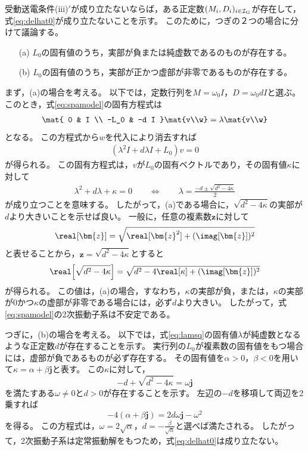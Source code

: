 \documentclass[tombow,dvipdfmx]{corona-a5-1.1}
\begin{document}
\begin{証明}
受動送電条件(iii)$'$が成り立たないならば，ある正定数$(M_i,D_i)_{i \in \mathcal{I}_{\rm G}}$が存在して，式\ref{eq:delhat0}が成り立たないことを示す。
このために，つぎの２つの場合に分けて議論する。
\begin{itemize}
\item[(a)] $L_0$の固有値のうち，実部が負または純虚数であるのものが存在する。
\item[(b)] $L_0$の固有値のうち，実部が正かつ虚部が非零であるものが存在する。
\end{itemize}
まず，(a)の場合を考える。
以下では，定数行列を$M=\omega_0 I$，$D=\omega_0 d I$と選ぶ。
このとき，式\ref{eq:spamodel}の固有方程式は
\begin{align*}
\mat{
0 & I \\
-L_0 & -d I
}
\mat{v\\w}
=
\lambda \mat{v\\w}
\end{align*}
となる。
この方程式から$w$を代入により消去すれば
\begin{align*}
\left(\lambda^2 I +d \lambda I + L_0
\right) v =0
\end{align*}
が得られる。
この固有方程式は，$v$が$L_0$の固有ベクトルであり，その固有値$\kappa$に対して
\begin{align}\label{eq:lamsq}
\lambda^2 + d\lambda +\kappa =0
\qquad
\Longleftrightarrow
\qquad
\lambda = \frac{-d \pm \sqrt{d^2-4\kappa} }{2}
\end{align}
が成り立つことを意味する。
したがって，(a)である場合に，$\sqrt{d^2 - 4\kappa }$の実部が$d$より大きいことを示せば良い。
一般に，任意の複素数$\bm{z}$に対して
\begin{align*}
\real[\bm{z}] = \sqrt{ \real[\bm{z}^2 ] + (\imag[\bm{z}])^2 }
\end{align*}
と表せることから，$\bm{z} = \sqrt{d^2 - 4\kappa }$とすると
\begin{align*}
\real \Bigl[
\sqrt{d^2 - 4\kappa }
\Bigr]
=\sqrt{
d^2 - 4 \real[\kappa]
+
(\imag[ \bm{z} ])^2
}
\end{align*}
が得られる。
この値は，(a)の場合，すなわち，$\kappa$の実部が負，または，$\kappa$の実部が0かつ$\kappa$の虚部が非零である場合には，必ず$d$より大きい。
したがって，式\ref{eq:spamodel}の2次振動子系は不安定である。

つぎに，(b)の場合を考える。
以下では，式\ref{eq:lamsq}の固有値$\lambda$が純虚数となるような正定数$d$が存在することを示す。
実行列の$L_0$が複素数の固有値をもつ場合には，虚部が負であるものが必ず存在する。
その固有値を$\alpha>0$，$\beta < 0$を用いて$\kappa = \alpha + \beta \bm{j}$と表す。
この$\kappa$に対して，
\[
-d + \sqrt{d^2-4\kappa}  = \omega \bm{j}
\]
を満たすある$\omega\neq 0$と$d>0$が存在することを示す。
左辺の$-d$を移項して両辺を2乗すれば
\[
-4 (\alpha + \beta \bm{j}) = 2d \omega \bm{j} -\omega^2
\]
を得る。
この方程式は，$\omega = 2\sqrt{\alpha}$，$d=-\frac{\beta}{\sqrt{\alpha}}$と選べば満たされる。
したがって，2次振動子系は定常振動解をもつため，式\ref{eq:delhat0}は成り立たない。
\end{証明}
\end{document}
